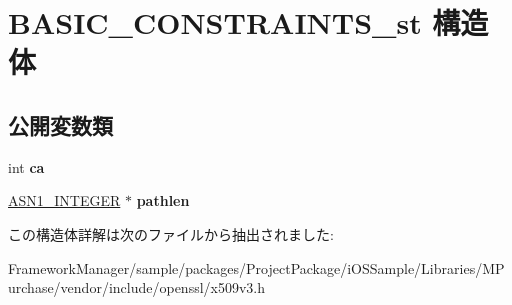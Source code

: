 \hypertarget{struct_b_a_s_i_c___c_o_n_s_t_r_a_i_n_t_s__st}{}\section{B\+A\+S\+I\+C\+\_\+\+C\+O\+N\+S\+T\+R\+A\+I\+N\+T\+S\+\_\+st 構造体}
\label{struct_b_a_s_i_c___c_o_n_s_t_r_a_i_n_t_s__st}
\subsection*{公開変数類}
\begin{DoxyCompactItemize}
\item 
\hypertarget{struct_b_a_s_i_c___c_o_n_s_t_r_a_i_n_t_s__st_ab8ac4eeb5ae30bd87b9ffdef9e35c218}{}int {\bfseries ca}\label{struct_b_a_s_i_c___c_o_n_s_t_r_a_i_n_t_s__st_ab8ac4eeb5ae30bd87b9ffdef9e35c218}

\item 
\hypertarget{struct_b_a_s_i_c___c_o_n_s_t_r_a_i_n_t_s__st_ab0a6cfe28df8cd5f8bc4f24a3277c7b4}{}\hyperlink{structasn1__string__st}{A\+S\+N1\+\_\+\+I\+N\+T\+E\+G\+E\+R} $\ast$ {\bfseries pathlen}\label{struct_b_a_s_i_c___c_o_n_s_t_r_a_i_n_t_s__st_ab0a6cfe28df8cd5f8bc4f24a3277c7b4}

\end{DoxyCompactItemize}


この構造体詳解は次のファイルから抽出されました\+:\begin{DoxyCompactItemize}
\item 
Framework\+Manager/sample/packages/\+Project\+Package/i\+O\+S\+Sample/\+Libraries/\+M\+Purchase/vendor/include/openssl/x509v3.\+h\end{DoxyCompactItemize}

